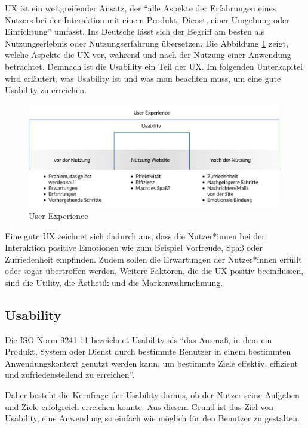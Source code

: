  \ac{UX} ist ein weitgreifender Ansatz, der \enquote{alle Aspekte der Erfahrungen eines Nutzers bei der Interaktion mit einem Produkt, Dienst, einer Umgebung oder Einrichtung} umfasst.
Ins Deutsche lässt sich der Begriff am besten als Nutzungserlebnis oder Nutzungserfahrung übersetzen. \citep[vgl.]{jacobsen_praxisbuch_2019}
Die Abbildung \ref{fig:abb2} zeigt, welche Aspekte die \ac{UX} vor, während und nach der Nutzung einer Anwendung betrachtet.
Demnach ist die Usability ein Teil der \ac{UX}.
Im folgenden Unterkapitel wird erläutert, was Usability ist und was man beachten muss, um eine gute Usability zu erreichen.

\begin{figure}[h]
	\centering
    	\includegraphics[width=0.99\textwidth]{Images/User_Experience.png}
   	\caption{User Experience}
   	\label{fig:abb2}
\end{figure}

Eine gute \ac{UX} zeichnet sich dadurch aus, dass die Nutzer*innen bei der Interaktion positive Emotionen wie zum Beispiel Vorfreude, Spaß oder Zufriedenheit empfinden.
Zudem sollen die Erwartungen der Nutzer*innen erfüllt oder sogar übertroffen werden.
Weitere Faktoren, die die \ac{UX} positiv beeinflussen, sind die Utility, die Ästhetik und die Markenwahrnehmung. \citep[vgl.]{weichert_quick_2021}

\subsection{Usability}

Die ISO-Norm 9241-11 \citep{ISO_standard} bezeichnet Usability als \enquote{das Ausmaß, in dem ein Produkt, System oder Dienst durch bestimmte Benutzer in einem bestimmten Anwendungskontext genutzt werden kann, um bestimmte Ziele effektiv, effizient und zufriedenstellend zu erreichen}.

Daher besteht die Kernfrage der Usability daraus, ob der Nutzer seine Aufgaben und Ziele erfolgreich erreichen konnte.
Aus diesem Grund ist das Ziel von Usability, eine Anwendung so einfach wie möglich für den Benutzer zu gestalten. \citep[vgl.]{jacobsen_praxisbuch_2019}


